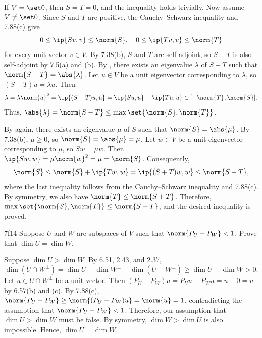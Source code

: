 \begin{sol}
    If $V = \set 0$, then $S = T = 0$, and the inequality holds trivially.
    Now assume $V \neq \set 0$.
    Since $S$ and $T$ are positive, the Cauchy--Schwarz inequality and 7.88(c) give
    \[
        0 \leq \ip{Sv, v} \leq \norm{S}, \quad 0 \leq \ip{Tv, v} \leq \norm{T}
    \]
    for every unit vector $v \in V$.
    By 7.38(b), $S$ and $T$ are self-adjoint, so $S - T$ is also self-adjoint by 7.5(a) and (b).
    By , there exists an eigenvalue $\lambda$ of $S - T$ such that $\norm{S - T} = \abs{\lambda}$.
    Let $u \in V$ be a unit eigenvector corresponding to $\lambda$, so $(S - T)u = \lambda u$.
    Then
    \[
        \lambda = \lambda\norm{u}^2 = \ip{(S - T)u, u} = \ip{Su, u} - \ip{Tu, u} \in [ -\norm{T}, \norm{S} ].
    \]
    Thus, $\abs{\lambda} = \norm{S - T} \leq \max\set{\norm{S}, \norm{T}}$.

    By  again, there exists an eigenvalue $\mu$ of $S$ such that $\norm{S} = \abs{\mu}$.
    By 7.38(b), $\mu \geq 0$, so $\norm{S} = \abs{\mu} = \mu$.
    Let $w \in V$ be a unit eigenvector corresponding to $\mu$, so $Sw = \mu w$.
    Then $\ip{Sw, w} = \mu\norm{w}^2 = \mu = \norm{S}$.
    Consequently, 
    \[
        \norm{S} \leq \norm{S} + \ip{Tw, w} = \ip{(S + T)w, w} \leq \norm{S + T},
    \]
    where the last inequality follows from the Cauchy--Schwarz inequality and 7.88(c).
    By symmetry, we also have $\norm{T} \leq \norm{S + T}$.
    Therefore, $\max\set{\norm{S}, \norm{T}} \leq \norm{S + T}$, and the desired inequality is proved.
\end{sol}

\begin{exercise}{7f14}
    Suppose $U$ and $W$ are subspaces of $V$ such that $\norm{P_U - P_W} < 1$.
    Prove that $\dim U = \dim W$.
\end{exercise}

\begin{sol}
    Suppose $\dim U > \dim W$.
    By 6.51, 2.43, and 2.37,
    \[
        \dim(U \cap W^\perp) = \dim U + \dim W^\perp - \dim(U + W^\perp) \geq \dim U - \dim W > 0.
    \]
    Let $u \in U \cap W^\perp$ be a unit vector.
    Then $(P_U - P_W)u = P_U u - P_W u = u - 0 = u$ by 6.57(b) and (c).
    By 7.88(c), $\norm{P_U - P_W} \geq \norm{(P_U - P_W)u} = \norm{u} = 1$, contradicting the assumption that $\norm{P_U - P_W} < 1$.
    Therefore, our assumption that $\dim U > \dim W$ must be false.
    By symmetry, $\dim W > \dim U$ is also impossible.
    Hence, $\dim U = \dim W$.
\end{sol}

